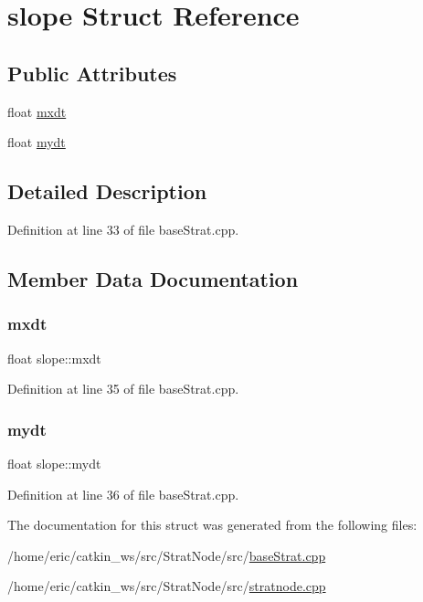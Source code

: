 \hypertarget{structslope}{}\section{slope Struct Reference}
\label{structslope}
\subsection*{Public Attributes}
\begin{DoxyCompactItemize}
\item 
float \mbox{\hyperlink{structslope_aefff787277587c860697df76b3b9526d}{mxdt}}
\item 
float \mbox{\hyperlink{structslope_a385bac2747d0c2c6fc307c85369da0cf}{mydt}}
\end{DoxyCompactItemize}


\subsection{Detailed Description}


Definition at line 33 of file base\+Strat.\+cpp.



\subsection{Member Data Documentation}
\mbox{\label{structslope_aefff787277587c860697df76b3b9526d}} 
\subsubsection{\texorpdfstring{mxdt}{mxdt}}
{\footnotesize\ttfamily float slope\+::mxdt}



Definition at line 35 of file base\+Strat.\+cpp.

\mbox{\label{structslope_a385bac2747d0c2c6fc307c85369da0cf}} 
\subsubsection{\texorpdfstring{mydt}{mydt}}
{\footnotesize\ttfamily float slope\+::mydt}



Definition at line 36 of file base\+Strat.\+cpp.



The documentation for this struct was generated from the following files\+:\begin{DoxyCompactItemize}
\item 
/home/eric/catkin\+\_\+ws/src/\+Strat\+Node/src/\mbox{\hyperlink{baseStrat_8cpp}{base\+Strat.\+cpp}}\item 
/home/eric/catkin\+\_\+ws/src/\+Strat\+Node/src/\mbox{\hyperlink{stratnode_8cpp}{stratnode.\+cpp}}\end{DoxyCompactItemize}
